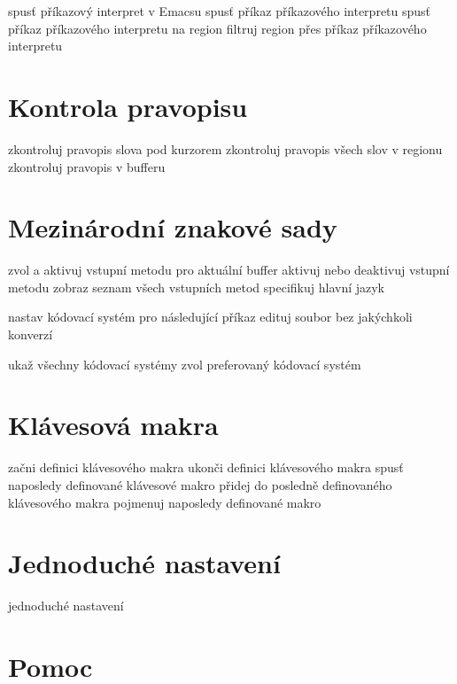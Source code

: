  spusť příkazový interpret v Emacsu
 spusť příkaz příkazového interpretu
 spusť příkaz příkazového interpretu na region
 filtruj region přes příkaz příkazového interpretu

\section{Kontrola pravopisu}

 zkontroluj pravopis slova pod kurzorem
 zkontroluj pravopis všech slov v regionu
 zkontroluj pravopis v bufferu

\section{Mezinárodní znakové sady}

 zvol a aktivuj vstupní metodu pro aktuální buffer
 aktivuj nebo deaktivuj vstupní metodu
 zobraz seznam všech vstupních metod
 specifikuj hlavní jazyk

 nastav kódovací systém pro následující příkaz
 edituj soubor bez jakýchkoli konverzí

 ukaž všechny kódovací systémy
 zvol preferovaný kódovací systém

\section{Klávesová makra}

 začni definici klávesového makra
 ukonči definici klávesového makra
 spusť naposledy definované klávesové makro
 přidej do posledně definovaného klávesového makra
 pojmenuj naposledy definované makro

\section{Jednoduché nastavení}

 jednoduché nastavení

\section{Pomoc}

